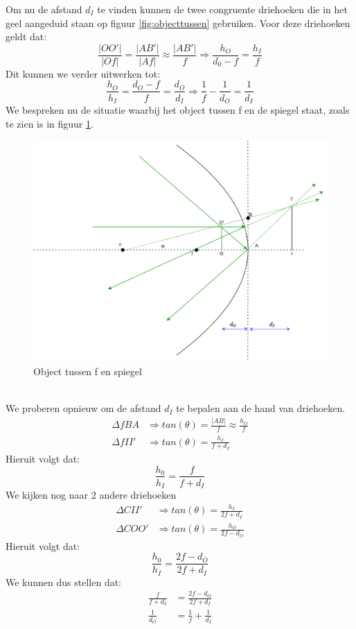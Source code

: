 \documentclass[a4paper,kul]{kulakarticle} %
\begin{document}
Om nu de afstand $d_I$ te vinden kunnen de twee congruente driehoeken die in het geel aangeduid staan op figuur \ref{fig:objecttussen} gebruiken. Voor deze driehoeken geldt dat: 
\begin{equation*}
	\frac{|OO'|}{|Of|}=\frac{|AB'|}{|Af|} \approx\frac{|AB'|}{f} \Rightarrow \frac{h_O}{d_0-f} = \frac{h_I}{f}
\end{equation*}
Dit kunnen we verder uitwerken tot:
\begin{equation*}
	\frac{h_O}{h_I} = \frac{d_O-f}{f}=\frac{d_O}{d_I}\Rightarrow\frac{1}{f}-\frac{1}{d_O} = \frac{1}{d_I}
\end{equation*}
\newpage
We bespreken nu de situatie waarbij het object tussen f en de spiegel staat, zoals te zien is in figuur \ref{fig:objectspiegelf}.
\begin{figure}[h]
	\centering
	\includegraphics[width=0.7\linewidth]{ObjectSpiegelF}
	\caption[Object tussen f en spiegel]{Object tussen f en spiegel}
	\label{fig:objectspiegelf}
\end{figure}\\
We proberen opnieuw om de afstand $d_I$ te bepalen aan de hand van driehoeken.
\begin{align*}
	\Delta fBA&\Rightarrow tan(\theta)=\frac{|AB|}{f}\approx\frac{h_O}{f}\\
	\Delta fII'&\Rightarrow tan(\theta)= \frac{h_I}{f+d_I}
\end{align*}
Hieruit volgt dat:
\begin{equation*}
	\frac{h_0}{h_I}=\frac{f}{f+d_I}
\end{equation*}
We kijken nog naar 2 andere driehoeken
\begin{align*}
	\Delta CII'&\Rightarrow tan(\theta)= \frac{h_I}{2f+d_I}\\
	\Delta COO'&\Rightarrow tan(\theta)= \frac{h_O}{2f-d_O}
\end{align*}
Hieruit volgt dat:
\begin{equation*}
	\frac{h_0}{h_I}=\frac{2f-d_O}{2f+d_I}
\end{equation*}
We kunnen dus stellen dat:
\begin{align*}
	\frac{f}{f+d_I}&=\frac{2f-d_O}{2f+d_I}\\
	\frac{1}{d_O} &= \frac{1}{f}+\frac{1}{d_I}
\end{align*}
\end{document}

